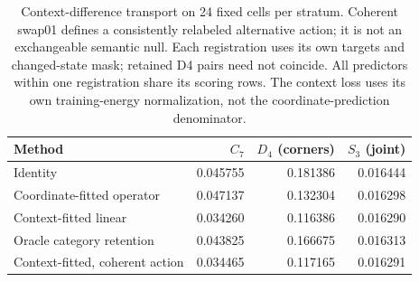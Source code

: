 \begin{table}[htbp]\centering\small
\begin{tabular}{lrrr}\toprule
Method & $C_7$ & $D_4$ (corners) & $S_3$ (joint) \\
\midrule
Identity & 0.045755 & 0.181386 & 0.016444 \\
Coordinate-fitted operator & 0.047137 & 0.132304 & 0.016298 \\
Context-fitted linear & 0.034260 & 0.116386 & 0.016290 \\
Oracle category retention & 0.043825 & 0.166675 & 0.016313 \\
Context-fitted, coherent action & 0.034465 & 0.117165 & 0.016291 \\
\bottomrule\end{tabular}
\caption{Context-difference transport on 24 fixed cells per stratum. Coherent swap01 defines a consistently relabeled alternative action; it is not an exchangeable semantic null. Each registration uses its own targets and changed-state mask; retained D4 pairs need not coincide. All predictors within one registration share its scoring rows. The context loss uses its own training-energy normalization, not the coordinate-prediction denominator.}
\label{tab:reproduction-context}\end{table}
